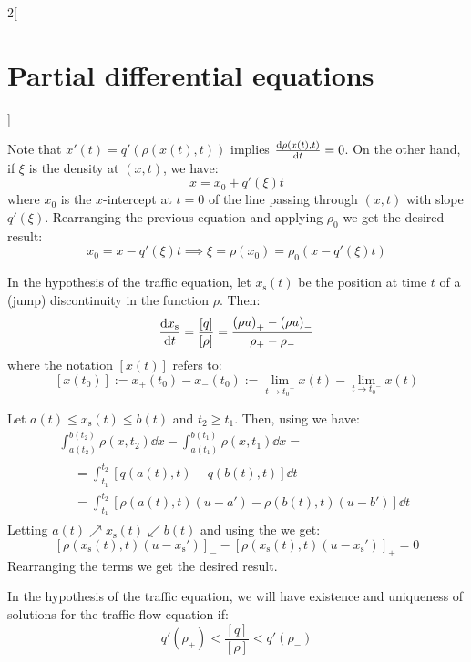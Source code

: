 \documentclass[../../../main_math.tex]{subfiles}
\begin{document}
\begin{multicols}{2}[\section{Partial differential equations}]
\begin{proposition}
  \end{proposition}
  \begin{sproof}
    Note that $x'(t)=q'(\rho(x(t),t))$ implies $\dv{\rho(x(t),t)}{t}=0$. On the other hand, if $\xi$ is the density at $(x,t)$, we have: $$x=x_0+q'(\xi)t$$ where $x_0$ is the $x$-intercept at $t=0$ of the line passing through $(x,t)$ with slope $q'(\xi)$. Rearranging the previous equation and applying $\rho_0$ we get the desired result:
    $$x_0=x-q'(\xi)t\implies \xi=\rho(x_0)=\rho_0(x-q'(\xi)t)$$
  \end{sproof}
  \begin{center}
    \begin{minipage}{\linewidth}
      \centering
      
      \label{PDE:traffic-char}
    \end{minipage}
  \end{center}
  \begin{proposition}
    In the hypothesis of the traffic equation, let $x_\mathrm{s}(t)$ be the position at time $t$ of a (jump) discontinuity in the function $\rho$. Then: $$\dv{x_\mathrm{s}}{t}=\frac{[q]}{[\rho]}=\frac{{(\rho u)}_+-{(\rho u)}_-}{\rho_+-\rho_-}$$ where the notation $[x(t)]$ refers to: $$[x(t_0)]:=x_+(t_0)-x_-(t_0):=\lim_{t\to{t_0}^+}x(t)-\lim_{t\to{t_0}^-}x(t)$$
  \end{proposition}
  \begin{sproof}
    Let $a(t)\leq x_\mathrm{s}(t)\leq b(t)$ and $t_2\geq t_1$. Then, using  we have:
    \begin{multline*}
      \int_{a(t_2)}^{b(t_2)}\rho(x,t_2)\dd{x}-\int_{a(t_1)}^{b(t_1)}\rho(x,t_1)\dd{x}=\\
      \begin{aligned}
         & =\int_{t_1}^{t_2}[q(a(t),t)-q(b(t),t)]\dd{t}                    \\
         & =\int_{t_1}^{t_2}[\rho(a(t),t)(u-a') -\rho(b(t),t)(u-b')]\dd{t}
      \end{aligned}
    \end{multline*}
    Letting $a(t)\nearrow x_\mathrm{s}(t)\swarrow b(t)$ and using the  we get: $$[\rho(x_\mathrm{s}(t),t)(u-{x_\mathrm{s}}')]_-- [\rho(x_\mathrm{s}(t),t)(u-{x_\mathrm{s}}')]_+=0$$
    Rearranging the terms we get the desired result.
  \end{sproof}
  \begin{lemma}
    In the hypothesis of the traffic equation, we will have existence and uniqueness of solutions for the traffic flow equation if: $$q'(\rho_+)<\frac{[q]}{[\rho]}< q'(\rho_-)$$
  \end{lemma}

\end{multicols}
\end{document}

